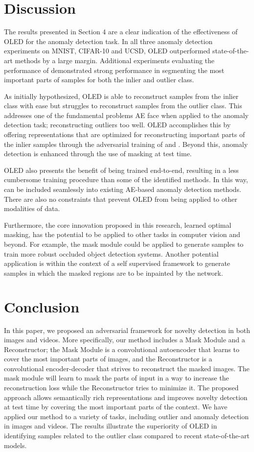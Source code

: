 \documentclass[10pt,twocolumn,letterpaper]{article}
\begin{document}
\section{Discussion}
The results presented in Section 4 are a clear indication of the effectiveness of OLED for the anomaly detection task. In all three anomaly detection experiments on MNIST, CIFAR-10 and UCSD, OLED outperformed state-of-the-art methods by a large margin. Additional experiments evaluating the performance of  demonstrated strong performance in segmenting the most important parts of samples for both the inlier and outlier class. 

As initially hypothesized, OLED is able to reconstruct samples from the inlier class with ease but struggles to reconstruct samples from the outlier class. This addresses one of the fundamental problems AE face when applied to the anomaly detection task; reconstructing outliers too well. OLED accomplishes this by offering representations that are optimized for reconstructing important parts of the inlier samples through the adversarial training of  and . Beyond this, anomaly detection is enhanced through the use of masking at test time.

OLED also presents the benefit of being trained end-to-end, resulting in a less cumbersome training procedure than some of the identified methods. In this way,  can be included seamlessly into existing AE-based anomaly detection methods. There are also no constraints that prevent OLED from being applied to other modalities of data.  

Furthermore, the core innovation proposed in this research, learned optimal masking, has the potential to be applied to other tasks in computer vision and beyond. For example, the mask module could be applied to generate samples to train more robust occluded object detection systems. Another potential application is within the context of a self supervised framework to generate samples in which the masked regions are to be inpainted by the network. 


\section{Conclusion}
In this paper, we proposed an adversarial framework for novelty detection in both images and videos. More specifically, our method includes a Mask Module and a Reconstructor; the Mask Module is a convolutional autoencoder that learns to cover the most important parts of images, and the Reconstructor is a convolutional encoder-decoder that strives to reconstruct the masked images. The mask module will learn to mask the parts of input in a way to increase the reconstruction loss while the Reconstructor tries to minimize it. The proposed approach allows semantically rich representations and improves novelty detection at test time by covering the most important parts of the context. We have applied our method to a variety of tasks, including outlier and anomaly detection in images and videos. The results illustrate the superiority of OLED in identifying samples related to the outlier class compared to recent state-of-the-art models.






{\small

}
\end{document}
